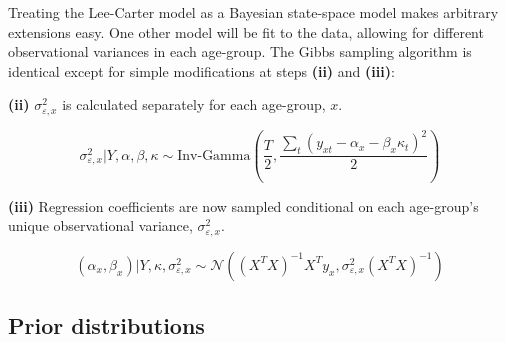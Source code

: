 \documentclass[
]{book}
\begin{document}
Treating the Lee-Carter model as a Bayesian state-space model makes arbitrary extensions easy. One other model will be fit to the data, allowing for different observational variances in each age-group. The Gibbs sampling algorithm is identical except for simple modifications at steps \textbf{(ii)} and \textbf{(iii)}:

\textbf{(ii)} \(\sigma^2_{\varepsilon, x}\) is calculated separately for each age-group, \(x\).

\[
\sigma^2_{\varepsilon, x} | Y, \alpha, \beta, \kappa \sim \text{Inv-Gamma}\left(
\frac{T}{2}, \frac{\sum_t(y_{xt} - \alpha_x - \beta_x\kappa_t)^2}{2}
\right)
\]

\textbf{(iii)} Regression coefficients are now sampled conditional on each age-group's unique observational variance, \(\sigma^2_{\varepsilon, x}\).

\[
(\alpha_x, \beta_x) | Y, \kappa, \sigma^2_{\varepsilon, x} \sim \mathcal N(
(X^TX)^{-1}X^Ty_x, \sigma^2_{\varepsilon, x} (X^TX)^{-1}
)
\]

\hypertarget{prior-distributions}{%
\subsection{Prior distributions}\label{prior-distributions}}
\end{document}
